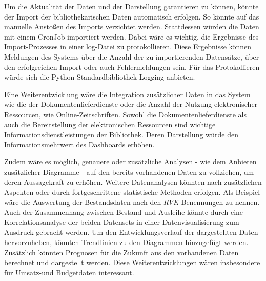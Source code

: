 Um die Aktualität der Daten und der Darstellung garantieren zu können, könnte der Import der bibliothekarischen Daten automatisch erfolgen. So könnte auf das manuelle
Anstoßen des Imports verzichtet werden. Stattdessen würden die Daten mit einem CronJob importiert werden. Dabei wäre es wichtig, die Ergebnisse des Import-Prozesses in einer log-Datei zu protokollieren. 
Diese Ergebnisse können Meldungen des Systems über die Anzahl der zu importierenden Datensätze, über den erfolgreichen Import oder auch Fehlermeldungen sein.
Für das Protokollieren würde sich die Python Standardbibliothek Logging anbieten.

Eine Weiterentwicklung wäre die Integration zusätzlicher Daten in das System wie die der Dokumentenlieferdienste oder die Anzahl der Nutzung elektronischer Ressourcen, wie Online-Zeitschriften. 
Sowohl die Dokumentenlieferdienste als auch die Bereitstellung der elektronischen Ressourcen sind wichtige Informationsdienstleistungen der Bibliothek. 
Deren Darstellung würde den Informationsmehrwert des Dashboards erhöhen.


Zudem wäre es möglich, genauere oder zusätzliche Analysen - wie dem Anbieten zusätzlicher Diagramme - auf den bereits vorhandenen Daten zu vollziehen, um deren Aussagekraft zu erhöhen.
Weitere Datenanalysen könnten nach zusätzlichen Aspekten oder durch fortgeschrittene statistische Methoden erfolgen. Als Beispiel wäre die Auswertung der Bestandsdaten nach den \textit{\acrshort{RVK}}-Benennungen
zu nennen. Auch der Zusammenhang zwischen Bestand und Ausleihe könnte durch eine Korrelationsanalyse der beiden Datensets in einer Datenvisualisierung zum Ausdruck gebracht werden.
Um den Entwicklungsverlauf der dargestellten Daten hervorzuheben, könnten Trendlinien zu den Diagrammen hinzugefügt werden. Zusätzlich könnten Prognosen
für die Zukunft aus den vorhandenen Daten berechnet und dargestellt werden. Diese Weiterentwicklungen wären insbesondere für Umsatz-und Budgetdaten interessant.




